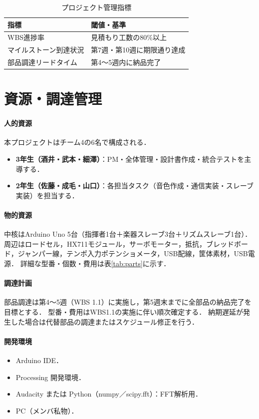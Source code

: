 \documentclass[lualatex,book,paper=a4paper,jafontsize=11.5pt,jafontscale=1.05]{jlreq}
\begin{document}
\begin{table}[htbp]
\centering
\begin{tabular}{L{5cm}L{9cm}}
  \toprule
  \textbf{指標} & \textbf{閾値・基準} \\
  \midrule
  WBS進捗率 & 見積もり工数の80\%以上 \\
  マイルストーン到達状況 & 第7週・第10週に期限通り達成 \\
  部品調達リードタイム & 第4〜5週内に納品完了 \\
  \bottomrule
\end{tabular}
\caption{プロジェクト管理指標}
\label{tab:pm_tpm}
\end{table}

\section{資源・調達管理}

\paragraph{人的資源}
本プロジェクトはチーム4の6名で構成される．
\begin{itemize}[leftmargin=1.2em]
  \item \textbf{3年生（酒井・武本・細澤）}：PM・全体管理・設計書作成・統合テストを主導する．
  \item \textbf{2年生（佐藤・成毛・山口）}：各担当タスク（音色作成・通信実装・スレーブ実装）を担当する．
\end{itemize}

\paragraph{物的資源}
中核はArduino Uno 5台（指揮者1台＋楽器スレーブ3台＋リズムスレーブ1台）．
周辺はロードセル，HX711モジュール，サーボモーター，抵抗，ブレッドボード，ジャンパー線，テンポ入力ポテンショメータ，USB配線，筐体素材，USB電源．
詳細な型番・個数・費用は表\ref{tab:parts}に示す．

\paragraph{調達計画}
部品調達は第4〜5週（WBS 1.1）に実施し，第5週末までに全部品の納品完了を目標とする．
型番・費用はWBS1.1の実施に伴い順次確定する．
納期遅延が発生した場合は代替部品の調達またはスケジュール修正を行う．

\paragraph{開発環境}
\begin{itemize}[leftmargin=1.2em]
  \item Arduino IDE．
  \item Processing 開発環境．
  \item Audacity または Python（numpy／scipy.fft）：FFT解析用．
  \item PC（メンバ私物）．
\end{itemize}
\end{document}
